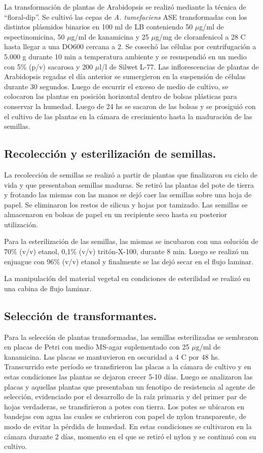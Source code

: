 La transformación de plantas de Arabidopsis se realizó mediante la técnica de ``floral-dip''.
Se cultivó las cepas de \textit{A. tumefaciens} ASE transformadas con los distintos plásmidos binarios en 100 ml de LB conteniendo 50 $\mu$g/ml de espectinomicina, 50 $\mu$g/ml de kanamicina y 25 $\mu$g/mg de cloranfenicol a 28 \degree C hasta llegar a una DO600 cercana a 2.
Se cosechó las células por centrifugación a 5.000 g durante 10 min a temperatura ambiente y se resuspendió en un medio con 5\% (p/v) sacarosa y 200 $\mu$l/l de Silwet L-77.
Las inflorescencias de plantas de Arabidopsis regadas el día anterior se sumergieron en la suspensión de células durante 30 segundos.
Luego de escurrir el exceso de medio de cultivo, se colocaron las plantas en posición horizontal dentro de bolsas plásticas para conservar la humedad.
Luego de 24 hs se sacaron de las bolsas y se prosiguió con el cultivo de las plantas en la cámara de crecimiento hasta la maduración de las semillas.


\subsection{Recolección y esterilización de semillas.}

La recolección de semillas se realizó a partir de plantas que finalizaron su ciclo de vida y que presentaban semillas maduras.
Se retiró las plantas del pote de tierra y frotando las mismas con las manos se dejó caer las semillas sobre una hoja de papel.
Se eliminaron los restos de silicua y hojas por tamizado. Las semillas se almacenaron en bolsas de papel en un recipiente seco hasta su posterior utilización.

Para la esterilización de las semillas, las mismas se incubaron con una solución de 70\% (v/v) etanol, 0,1\% (v/v) tritón-X-100, durante 8 min. 
Luego se realizó un enjuague con 96\% (v/v) etanol y finalmente se las dejó secar en el flujo laminar.

La manipulación del material vegetal en condiciones de esterilidad se realizó en una cabina de flujo laminar.

\subsection{Selección de transformantes.}
Para la selección de plantas transformadas, las semillas esterilizadas se sembraron en placas de Petri con medio MS-agar suplementado con 25 $\mu$g/ml de kanamicina.
Las placas se mantuvieron en oscuridad a 4 \degree C por 48 hs. Transcurrido este período se transfirieron las placas a la cámara de cultivo y en estas condiciones las plantas se dejaron crecer 5-10 días.
Luego se analizaron las placas y aquellas plantas que presentaban un fenotipo de resistencia al agente de selección, evidenciado por el desarrollo de la raíz primaria y del primer par de hojas verdaderas, se transfirieron a potes con tierra.
Los potes se ubicaron en bandejas con agua las cuales se cubrieron con papel de nylon transparente, de modo de evitar la pérdida de humedad.
En estas condiciones se cultivaron en la cámara durante 2 días, momento en el que se retiró el nylon y se continuó con su cultivo.

